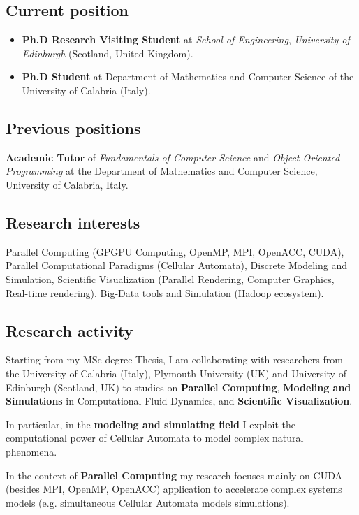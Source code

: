 \documentclass[a4paper,10pt]{article}
\begin{document}
 
\subsection{Current position}
\begin{itemize}
 
  \item \textbf{Ph.D Research Visiting Student} at \textit{School of
  Engineering}, \textit{University of Edinburgh} (Scotland, United Kingdom).
  \item \textbf{Ph.D Student} at Department of Mathematics and Computer Science
  of the University of Calabria (Italy).
\end{itemize}

\subsection{Previous positions}
\textbf{Academic Tutor} of  \textit{Fundamentals of Computer Science} and
\textit{Object-Oriented Programming} at the Department of Mathematics and
Computer Science, University of Calabria, Italy.


\subsection{Research interests}
Parallel Computing (GPGPU Computing, OpenMP, MPI, OpenACC, CUDA),
Parallel Computational Paradigms (Cellular Automata), Discrete Modeling and
Simulation, Scientific Visualization (Parallel Rendering, Computer Graphics,
Real-time rendering). Big-Data tools and Simulation (Hadoop ecosystem). 

\subsection{Research activity}
Starting from my MSc degree Thesis, I am collaborating with researchers from the
University of Calabria (Italy), Plymouth University (UK) and University of
Edinburgh (Scotland, UK) to studies on \textbf{Parallel Computing},
\textbf{Modeling and Simulations} in Computational Fluid Dynamics, and
\textbf{Scientific Visualization}.

In particular, in the \textbf{modeling and simulating field} I exploit the
computational power of Cellular Automata to model complex natural phenomena.

In the context of \textbf{Parallel Computing} my research focuses mainly on CUDA
(besides MPI, OpenMP, OpenACC) application to accelerate complex systems models
(e.g. simultaneous Cellular Automata models simulations).
\end{document}
